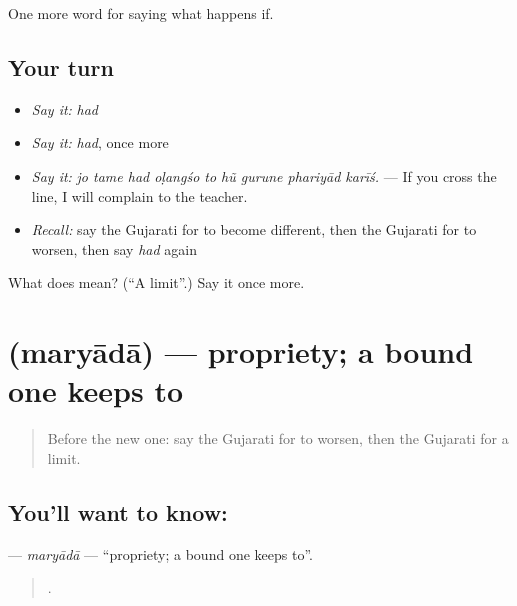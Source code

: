\begin{grammarlens}[title={What you've built}]
One more word for saying what happens if.
\end{grammarlens}

\subsection*{Your turn}
\begin{itemize}
\raggedright
  \item \emph{Say it:} \emph{had}
  \item \emph{Say it:} \emph{had}, once more
  \item \emph{Say it:} \emph{jo tame had oḷangśo to hũ gurune phariyād karīś.} — If you cross the line, I will complain to the teacher.
  \item \emph{Recall:} say the Gujarati for to become different, then the Gujarati for to worsen, then say \emph{had} again
\end{itemize}

\begin{tcolorbox}[breakable,colback=teal!4,colframe=teal!35!black,title={Before you move on}]
What does  mean? (\textquotedblleft{}A limit\textquotedblright{}.) Say it once more.
\end{tcolorbox}
\section[\texorpdfstring{\gu{મર્યાદા} (maryādā)}{મર્યાદા (maryādā)}]{ (maryādā) — propriety; a bound one keeps to}

\label{lesson:GU-C378-maryada}



\begin{quote}
Before the new one: say the Gujarati for to worsen, then the Gujarati for a limit.
\end{quote}

\subsection*{You'll want to know: }
\textbf{} — \emph{maryādā} — \textquotedblleft{}propriety; a bound one keeps to\textquotedblright{}.

\begin{quote}
       .
\end{quote}

